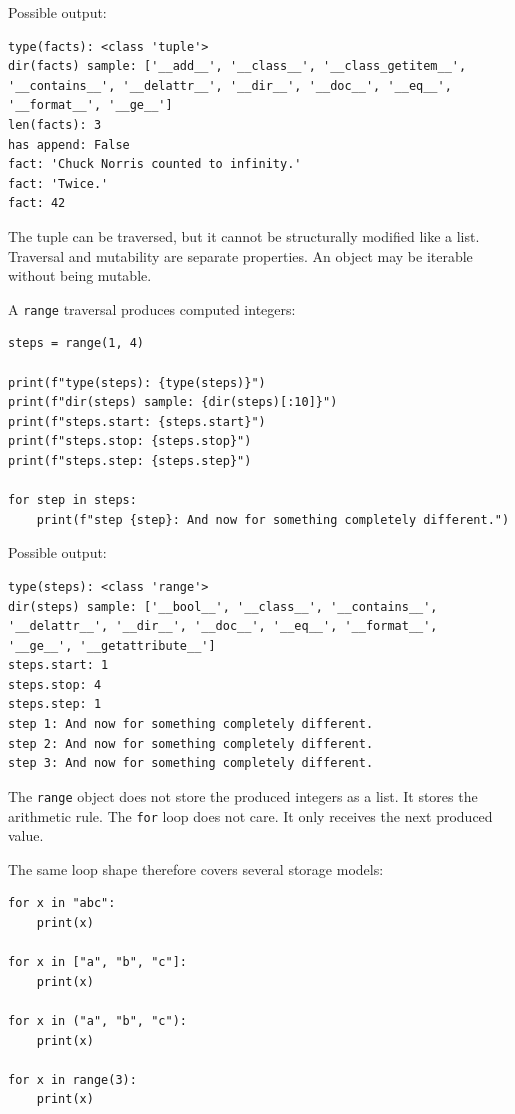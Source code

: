 Possible output:

\begin{verbatim}
type(facts): <class 'tuple'>
dir(facts) sample: ['__add__', '__class__', '__class_getitem__',
'__contains__', '__delattr__', '__dir__', '__doc__', '__eq__',
'__format__', '__ge__']
len(facts): 3
has append: False
fact: 'Chuck Norris counted to infinity.'
fact: 'Twice.'
fact: 42
\end{verbatim}

The tuple can be traversed, but it cannot be structurally modified like a list. Traversal and mutability are separate properties. An object may be iterable without being mutable.

A \texttt{range} traversal produces computed integers:

\begin{verbatim}
steps = range(1, 4)

print(f"type(steps): {type(steps)}")
print(f"dir(steps) sample: {dir(steps)[:10]}")
print(f"steps.start: {steps.start}")
print(f"steps.stop: {steps.stop}")
print(f"steps.step: {steps.step}")

for step in steps:
    print(f"step {step}: And now for something completely different.")
\end{verbatim}

Possible output:

\begin{verbatim}
type(steps): <class 'range'>
dir(steps) sample: ['__bool__', '__class__', '__contains__',
'__delattr__', '__dir__', '__doc__', '__eq__', '__format__',
'__ge__', '__getattribute__']
steps.start: 1
steps.stop: 4
steps.step: 1
step 1: And now for something completely different.
step 2: And now for something completely different.
step 3: And now for something completely different.
\end{verbatim}

The \texttt{range} object does not store the produced integers as a list. It stores the arithmetic rule. The \texttt{for} loop does not care. It only receives the next produced value.

The same loop shape therefore covers several storage models:

\begin{verbatim}
for x in "abc":
    print(x)

for x in ["a", "b", "c"]:
    print(x)

for x in ("a", "b", "c"):
    print(x)

for x in range(3):
    print(x)
\end{verbatim}

